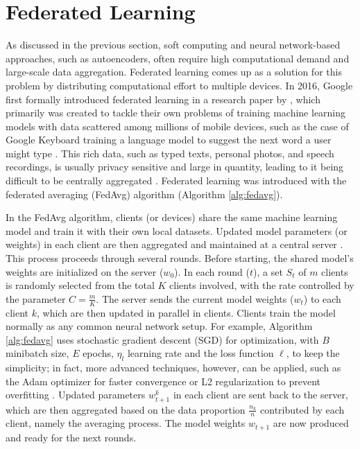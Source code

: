 \section{Federated Learning}

As discussed in the previous section, soft computing and neural network-based approaches, such as autoencoders, often require high computational demand and large-scale data aggregation. Federated learning comes up as a solution for this problem by distributing computational effort to multiple devices. In 2016, Google first formally introduced federated learning in a research paper by \cite{mcmahan2023communication}, which primarily was created to tackle their own problems of training machine learning models with data scattered among millions of mobile devices, such as the case of Google Keyboard training a language model to suggest the next word a user might type \citep{47586}. This rich data, such as typed texts, personal photos, and speech recordings, is usually privacy sensitive and large in quantity, leading to it being difficult to be centrally aggregated \citep{mcmahan2023communication}. Federated learning was introduced with the federated averaging (FedAvg) algorithm (Algorithm \ref{alg:fedavg}).

In the FedAvg algorithm, clients (or devices) share the same machine learning model and train it with their own local datasets. Updated model parameters (or weights) in each client are then aggregated and maintained at a central server \citep{mcmahan2023communication}. This process proceeds through several rounds. Before starting, the shared model's weights are initialized on the server ($w_0$). In each round ($t$), a set $S_t$ of $m$ clients is randomly selected from the total $K$ clients involved, with the rate controlled by the parameter $C = \frac{m}{K}$. The server sends the current model weights ($w_t$) to each client $k$, which are then updated in parallel in clients. Clients train the model normally as any common neural network setup. For example, Algorithm \ref{alg:fedavg} uses stochastic gradient descent (SGD) for optimization, with $B$ minibatch size, $E$ epochs,  $\eta_l$ learning rate and the loss function $\ell$, to keep the simplicity; in fact, more advanced techniques, however, can be applied, such as the Adam optimizer for faster convergence or L2 regularization to prevent overfitting \citep{mcmahan2023communication}. Updated parameters $w^{k}_{t+1}$ in each client are sent back to the server, which are then aggregated based on the data proportion $\frac{n_k}{n}$ contributed by each client, namely the averaging process. The model weights $w_{t+1}$ are now produced and ready for the next rounds.

